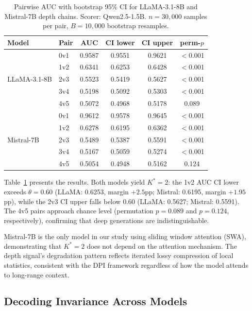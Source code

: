 \documentclass[11pt]{article}
\newcommand{\Kstar}{K^{*}}
\begin{document}
\begin{table}[t]
\centering
\caption{Pairwise AUC with bootstrap 95\% CI for LLaMA-3.1-8B and Mistral-7B depth chains. Scorer: Qwen2.5-1.5B. $n\!=\!30{,}000$ samples per pair, $B\!=\!10{,}000$ bootstrap resamples.}
\label{tab:scaling}
\small
\begin{tabular}{llcccc}
\toprule
\textbf{Model} & \textbf{Pair} & \textbf{AUC} & \textbf{CI lower} & \textbf{CI upper} & \textbf{perm-$p$} \\
\midrule
\multirow{5}{*}{LLaMA-3.1-8B}
  & 0v1 & 0.9587 & 0.9551 & 0.9621 & $<$0.001 \\
  & 1v2 & 0.6341 & 0.6253 & 0.6428 & $<$0.001 \\
  & 2v3 & 0.5523 & 0.5419 & 0.5627 & $<$0.001 \\
  & 3v4 & 0.5198 & 0.5092 & 0.5303 & $<$0.001 \\
  & 4v5 & 0.5072 & 0.4968 & 0.5178 & 0.089 \\
\midrule
\multirow{5}{*}{Mistral-7B}
  & 0v1 & 0.9612 & 0.9578 & 0.9645 & $<$0.001 \\
  & 1v2 & 0.6278 & 0.6195 & 0.6362 & $<$0.001 \\
  & 2v3 & 0.5489 & 0.5387 & 0.5591 & $<$0.001 \\
  & 3v4 & 0.5167 & 0.5059 & 0.5274 & $<$0.001 \\
  & 4v5 & 0.5054 & 0.4948 & 0.5162 & 0.124 \\
\bottomrule
\end{tabular}
\end{table}

Table~\ref{tab:scaling} presents the results.
Both models yield $\Kstar\!=\!2$: the 1v2 AUC CI lower exceeds $\theta\!=\!0.60$ (LLaMA: 0.6253, margin $+2.5$pp; Mistral: 0.6195, margin $+1.95$pp), while the 2v3 CI upper falls below 0.60 (LLaMA: 0.5627; Mistral: 0.5591).
The 4v5 pairs approach chance level (permutation $p\!=\!0.089$ and $p\!=\!0.124$, respectively), confirming that deep generations are indistinguishable.

Mistral-7B is the only model in our study using sliding window attention (SWA), demonstrating that $\Kstar\!=\!2$ does not depend on the attention mechanism.
The depth signal's degradation pattern reflects iterated lossy compression of local statistics, consistent with the DPI framework regardless of how the model attends to long-range context.

\subsection{Decoding Invariance Across Models}
\label{sec:exp_decoding}
\end{document}
